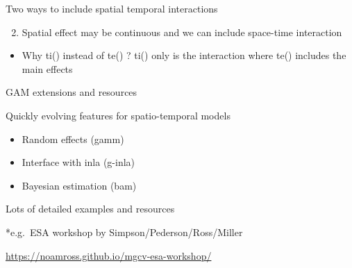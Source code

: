 \documentclass[ignorenonframetext,]{beamer}
\newenvironment{Shaded}{\begin{snugshade}}{\end{snugshade}}
\newcommand{\DataTypeTok}[1]{\textcolor[rgb]{0.13,0.29,0.53}{#1}}
\newcommand{\DecValTok}[1]{\textcolor[rgb]{0.00,0.00,0.81}{#1}}
\newcommand{\KeywordTok}[1]{\textcolor[rgb]{0.13,0.29,0.53}{\textbf{#1}}}
\newcommand{\NormalTok}[1]{#1}
\newcommand{\OperatorTok}[1]{\textcolor[rgb]{0.81,0.36,0.00}{\textbf{#1}}}
\newcommand{\StringTok}[1]{\textcolor[rgb]{0.31,0.60,0.02}{#1}}
\providecommand{\tightlist}{%
  \setlength{\itemsep}{0pt}\setlength{\parskip}{0pt}}
\begin{document}
\begin{frame}[fragile]{Two ways to include spatial temporal
interactions}
\protect\hypertarget{two-ways-to-include-spatial-temporal-interactions-1}{}

\begin{enumerate}
\setcounter{enumi}{1}
\tightlist
\item
  Spatial effect may be continuous and we can include space-time
  interaction
\end{enumerate}

\begin{itemize}
\tightlist
\item
  Why ti() instead of te() ? ti() only is the interaction where te()
  includes the main effects
\end{itemize}

\begin{Shaded}
\end{Shaded}

\end{frame}

\begin{frame}{GAM extensions and resources}
\protect\hypertarget{gam-extensions-and-resources}{}

Quickly evolving features for spatio-temporal models

\begin{itemize}
\tightlist
\item
  Random effects (gamm)
\item
  Interface with inla (g-inla)
\item
  Bayesian estimation (bam)
\end{itemize}

Lots of detailed examples and resources

*e.g.~ESA workshop by Simpson/Pederson/Ross/Miller

\url{https://noamross.github.io/mgcv-esa-workshop/}

\end{frame}
\end{document}
